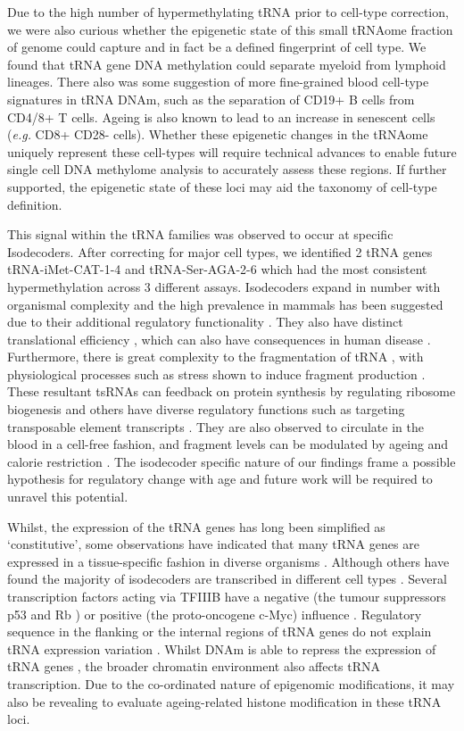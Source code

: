 \documentclass[
]{book}
\begin{document}
Due to the high number of hypermethylating tRNA prior to cell-type correction, we were also curious whether the epigenetic state of this small tRNAome fraction of genome could capture and in fact be a defined fingerprint of cell type.
We found that tRNA gene DNA methylation could separate myeloid from lymphoid lineages.
There also was some suggestion of more fine-grained blood cell-type signatures in tRNA DNAm, such as the separation of CD19+ B cells from CD4/8+ T cells.
Ageing is also known to lead to an increase in senescent cells (\emph{e.g.} CD8+ CD28- cells).
Whether these epigenetic changes in the tRNAome uniquely represent these cell-types will require technical advances to enable future single cell DNA methylome analysis to accurately assess these regions.
If further supported, the epigenetic state of these loci may aid the taxonomy of cell-type definition.

This signal within the tRNA families was observed to occur at specific Isodecoders.
After correcting for major cell types, we identified 2 tRNA genes tRNA-iMet-CAT-1-4 and tRNA-Ser-AGA-2-6 which had the most consistent hypermethylation across 3 different assays.
Isodecoders expand in number with organismal complexity and the high prevalence in mammals has been suggested due to their additional regulatory functionality \citep{Goodenbour2006, Keam2014}.
They also have distinct translational efficiency \citep{Geslain2010}, which can also have consequences in human disease \citep{Kirchner2017}.
Furthermore, there is great complexity to the fragmentation of tRNA \citep{Schimmel2017}, with physiological processes such as stress shown to induce fragment production \citep{Li2019}.
These resultant tsRNAs can feedback on protein synthesis by regulating ribosome biogenesis \citep{Kim2017} and others have diverse regulatory functions such as targeting transposable element transcripts \citep{Martinez2017}.
They are also observed to circulate in the blood in a cell-free fashion, and fragment levels can be modulated by ageing and calorie restriction \citep{Dhahbi2013}.
The isodecoder specific nature of our findings frame a possible hypothesis for regulatory change with age and future work will be required to unravel this potential.

Whilst, the expression of the tRNA genes has long been simplified as `constitutive', some observations have indicated that many tRNA genes are expressed in a tissue-specific fashion in diverse organisms \citep{Dittmar2006, Sagi2016}.
Although others have found the majority of isodecoders are transcribed in different cell types \citep{Parisien2013}.
Several transcription factors acting via TFIIIB \citep{Gomez-Roman2003} have a negative (the tumour suppressors p53 \citep{Crighton2003} and Rb \citep{Sutcliffe2000}) or positive (the proto-oncogene c-Myc) influence \citep{Gomez-Roman2003}.
Regulatory sequence in the flanking or the internal regions of tRNA genes do not explain tRNA expression variation \citep{Schmitt2014}.
Whilst DNAm is able to repress the expression of tRNA genes \citep{Besser1990}, the broader chromatin environment also affects tRNA transcription.
Due to the co-ordinated nature of epigenomic modifications, it may also be revealing to evaluate ageing-related histone modification in these tRNA loci.
\end{document}
